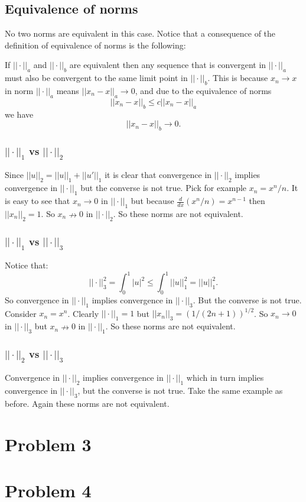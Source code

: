 \documentclass{article}
\begin{document}
\subsection*{Equivalence of norms}
No two norms are equivalent in this case. Notice that a consequence of the definition of
equivalence of norms is the following:

If $||\cdot||_a$ and $||\cdot||_b$ are equivalent then any sequence that is
convergent in $||\cdot||_a$ must also be convergent to the same limit point in
$||\cdot||_b$. This is because $x_n\to x$ in norm $||\cdot||_a$ means
$||x_n-x||_a\to 0$, and due to the equivalence of norms
\[
	||x_n-x||_b\leq c ||x_n-x||_a
\]
we have
\[
	||x_n-x||_b\to 0.
\]
\subsubsection*{$||\cdot||_1$ vs $||\cdot||_2$}
Since $||u||_2=||u||_1+||u'||_1$ it is clear that convergence in $||\cdot||_2$
implies convergence in $||\cdot||_1$ but the converse is not true.
Pick for example $x_n=x^n/n$. It is easy to see that $x_n\to 0$ in
$||\cdot||_1$ but because $\frac{d}{dx}(x^n/n)=x^{n-1}$ then $||x_n||_2=1$.
So $x_n\nrightarrow 0$ in $||\cdot||_2$. So these norms are not equivalent.
\subsubsection*{$||\cdot||_1$ vs $||\cdot||_3$}
Notice that:
\[
||\cdot||_3^2=\int_0^1|u|^2\leq \int_0^1 ||u||_1^2=||u||_1^2.
\]
So convergence in $||\cdot||_1$ implies convergence in $||\cdot||_3$. But the
converse is not true. Consider $x_n=x^n$. Clearly $||\cdot||_1=1$ but
$||x_n||_3=(1/(2n+1))^{1/2}$. So $x_n \to 0$ in $||\cdot||_3$ but
$x_n\nrightarrow 0$ in $||\cdot||_1$. So these norms are not equivalent.
\subsubsection*{$||\cdot||_2$ vs $||\cdot||_3$}
Convergence in $||\cdot||_2$ implies convergence in $||\cdot||_1$ which in turn
implies convergence in $||\cdot||_3$, but the converse is not true. Take the
same example as before. Again these norms are not equivalent.
\section*{Problem 3}
\section*{Problem 4}
\end{document}
